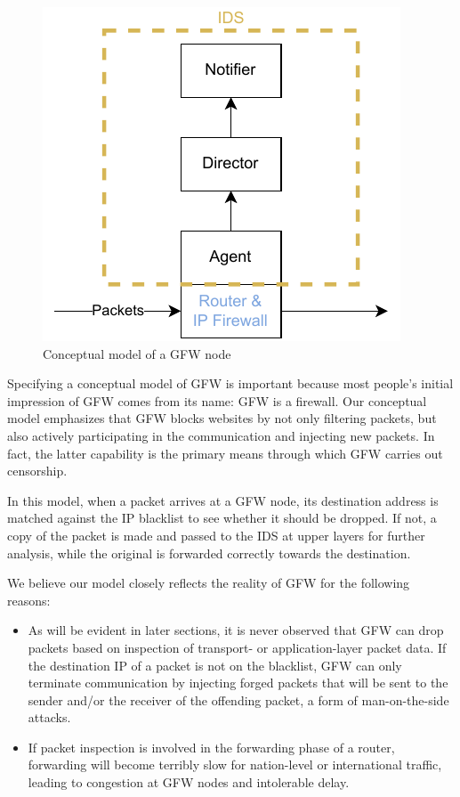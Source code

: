 \documentclass[sigconf, screen, balance=false]{acmart}
\begin{document}
\begin{figure}
    \includegraphics{gfw-node.pdf}
    \caption{Conceptual model of a GFW node}
    \label{fig:conceptual-model}
\end{figure}

Specifying a conceptual model of GFW is important because most people's initial impression of GFW comes from its name: GFW is a firewall. Our conceptual model emphasizes that GFW blocks websites by not only filtering packets, but also actively participating in the communication and injecting new packets. In fact, the latter capability is the primary means through which GFW carries out censorship.

In this model, when a packet arrives at a GFW node, its destination address is matched against the IP blacklist to see whether it should be dropped. If not, a copy of the packet is made and passed to the IDS at upper layers for further analysis, while the original is forwarded correctly towards the destination.

We believe our model closely reflects the reality of GFW for the following reasons:
\begin{itemize}
    \item As will be evident in later sections, it is never observed that GFW can drop packets based on inspection of transport- or application-layer packet data. If the destination IP of a packet is not on the blacklist, GFW can only terminate communication by injecting forged packets that will be sent to the sender and/or the receiver of the offending packet, a form of man-on-the-side attacks.
    \item If packet inspection is involved in the forwarding phase of a router, forwarding will become terribly slow for nation-level or international traffic, leading to congestion at GFW nodes and intolerable delay.
\end{itemize}
\end{document}
